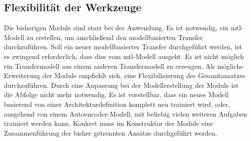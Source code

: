 	\subsection{Flexibilität der Werkzeuge}
	\label{subsec:FlexibilitätDerWerkzeuge}
	Die bisherigen Module sind starr bei der Anwendung. Es ist notwendig, ein \acl{mtl}-Modell zu erstellen, um anschließend den modellbasierten Transfer durchzuführen. Soll ein neuer modellbasierter Transfer durchgeführt werden, ist es zwingend erforderlich, dass dies vom \acl{mtl}-Modell ausgeht. Es ist nicht möglich ein Transfermodell aus einem anderen Transfermodell zu erzeugen. Als mögliche Erweiterung der Module empfiehlt sich, eine Flexibilisierung des Gesamtansatzes durchzuführen. Durch eine Anpassung bei der Modellerstellung der Module ist die Abfolge nicht mehr notwendig. Es ist vorstellbar, dass ein neues Modell basierend von einer Architekturdefinition komplett neu trainiert wird, oder, ausgehend von einem Autoencoder-Modell, mit beliebig vielen weiteren Aufgaben trainiert werden kann. Konkret muss im Konstruktor der Module eine Zusammenführung der bisher getrennten Ansätze durchgeführt werden.     


	   